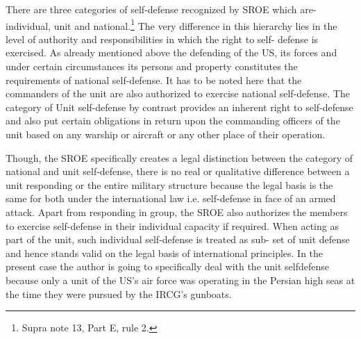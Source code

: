 \begin{multicols}{2}

\noi
There are three categories of self-defense recognized by SROE which are- individual, unit
and national.\footnote{ Supra note 13, Part E, rule 2.} The very difference in this hierarchy lies in the level of authority and
responsibilities in which the right to self- defense is exercised. As already mentioned above
the defending of the US, its forces and under certain circumstances its persons and property
constitutes the requirements of national self-defense. It has to be noted here that the
commanders of the unit are also authorized to exercise national self-defense. The category
of Unit self-defense by contrast provides an inherent right to self-defense and also put
certain obligations in return upon the commanding officers of the unit based on any warship
or aircraft or any other place of their operation.

\noi
Though, the SROE specifically creates a legal distinction between the category of national
and unit self-defense, there is no real or qualitative difference between a unit responding or
the entire military structure because the legal basis is the same for both under the
international law i.e. self-defense in face of an armed attack. Apart from responding in
group, the SROE also authorizes the members to exercise self-defense in their individual
capacity if required. When acting as part of the unit, such individual self-defense is treated
as sub- set of unit defense and hence stands valid on the legal basis of international
principles. In the present case the author is going to specifically deal with the unit selfdefense because only a unit of the US’s air force was operating in the Persian high seas at
the time they were pursued by the IRCG’s gunboats.



\vspace{.1cm}


\end{multicols}
